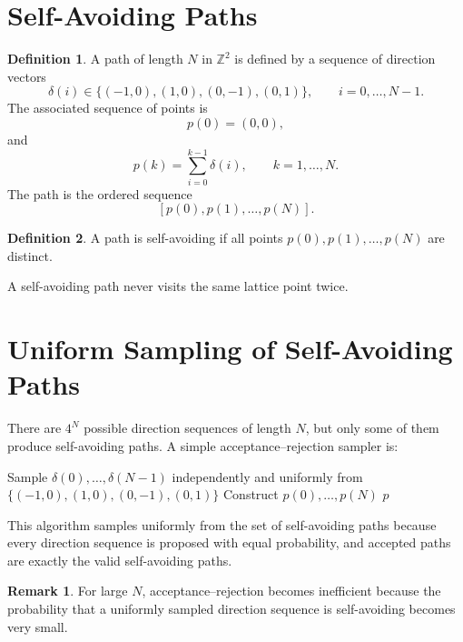 \documentclass[12pt,oneside]{book}
\numberwithin{equation}{section}
\theoremstyle{definition}
\newtheorem{definition}{Definition}[section]
\newtheorem{remark}{Remark}[section]
\theoremstyle{plain}
\theoremstyle{remark}
\newcommand{\Z}{\mathbb{Z}}
\begin{document}
\section{Self-Avoiding Paths}

\begin{definition}
A path of length $N$ in $\Z^2$ is defined by a sequence of direction vectors
\[
\delta(i)\in\{(-1,0),(1,0),(0,-1),(0,1)\},
\qquad i=0,\ldots,N-1.
\]
The associated sequence of points is
\[
p(0)=(0,0),
\]
and
\[
p(k)=\sum_{i=0}^{k-1}\delta(i),
\qquad k=1,\ldots,N.
\]
The path is the ordered sequence
\[
[p(0),p(1),\ldots,p(N)].
\]
\end{definition}

\begin{definition}
A path is self-avoiding if all points $p(0),p(1),\ldots,p(N)$ are distinct.
\end{definition}

A self-avoiding path never visits the same lattice point twice.

\section{Uniform Sampling of Self-Avoiding Paths}

There are $4^N$ possible direction sequences of length $N$, but only some of them produce self-avoiding paths. A simple acceptance--rejection sampler is:

\begin{algorithm}[H]
\caption{Acceptance--Rejection for Uniform Self-Avoiding Paths}
\begin{algorithmic}[1]
\Repeat
    \State Sample $\delta(0),\ldots,\delta(N-1)$ independently and uniformly from $\{(-1,0),(1,0),(0,-1),(0,1)\}$
    \State Construct $p(0),\ldots,p(N)$
\State \Return $p$
\end{algorithmic}
\end{algorithm}

This algorithm samples uniformly from the set of self-avoiding paths because every direction sequence is proposed with equal probability, and accepted paths are exactly the valid self-avoiding paths.

\begin{remark}
For large $N$, acceptance--rejection becomes inefficient because the probability that a uniformly sampled direction sequence is self-avoiding becomes very small.
\end{remark}
\end{document}

